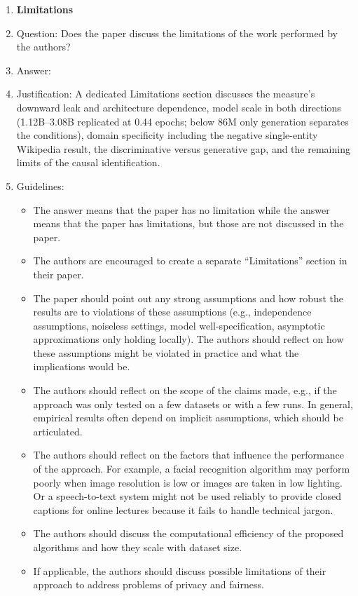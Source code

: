 \documentclass{article}
\begin{document}
\begin{enumerate}
\item {\bf Limitations}
    \item[] Question: Does the paper discuss the limitations of the work performed by the authors?
    \item[] Answer: \answerYes{}
    \item[] Justification: A dedicated Limitations section discusses the measure's downward leak and architecture dependence, model scale in both directions (1.12B--3.08B replicated at 0.44 epochs; below 86M only generation separates the conditions), domain specificity including the negative single-entity Wikipedia result, the discriminative versus generative gap, and the remaining limits of the causal identification.
    \item[] Guidelines:
    \begin{itemize}
        \item The answer \answerNA{} means that the paper has no limitation while the answer \answerNo{} means that the paper has limitations, but those are not discussed in the paper.
        \item The authors are encouraged to create a separate ``Limitations'' section in their paper.
        \item The paper should point out any strong assumptions and how robust the results are to violations of these assumptions (e.g., independence assumptions, noiseless settings, model well-specification, asymptotic approximations only holding locally). The authors should reflect on how these assumptions might be violated in practice and what the implications would be.
        \item The authors should reflect on the scope of the claims made, e.g., if the approach was only tested on a few datasets or with a few runs. In general, empirical results often depend on implicit assumptions, which should be articulated.
        \item The authors should reflect on the factors that influence the performance of the approach. For example, a facial recognition algorithm may perform poorly when image resolution is low or images are taken in low lighting. Or a speech-to-text system might not be used reliably to provide closed captions for online lectures because it fails to handle technical jargon.
        \item The authors should discuss the computational efficiency of the proposed algorithms and how they scale with dataset size.
        \item If applicable, the authors should discuss possible limitations of their approach to address problems of privacy and fairness.

\end{itemize}
\end{enumerate}
\end{document}
